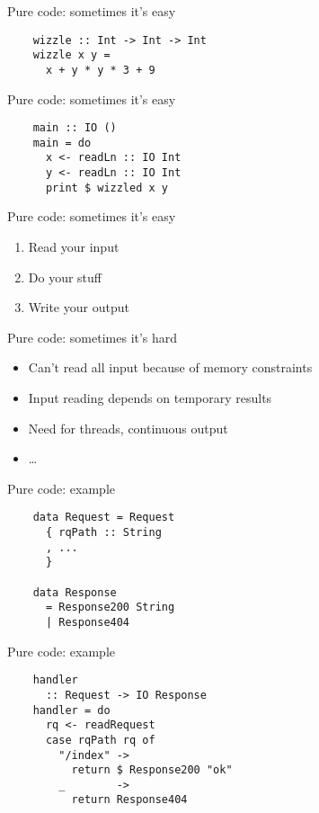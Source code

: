 \documentclass[20pt]{beamer}
\begin{document}
\begin{frame}[fragile]{Pure code: sometimes it's easy}
    \begin{lstlisting}
    wizzle :: Int -> Int -> Int
    wizzle x y =
      x + y * y * 3 + 9
    \end{lstlisting}
\end{frame}

\begin{frame}[fragile]{Pure code: sometimes it's easy}
    \begin{lstlisting}
    main :: IO ()
    main = do
      x <- readLn :: IO Int
      y <- readLn :: IO Int
      print $ wizzled x y
    \end{lstlisting}
\end{frame}

\begin{frame}{Pure code: sometimes it's easy}
    \begin{enumerate}
    \item Read your input
    \item Do your stuff
    \item Write your output
    \end{enumerate}
\end{frame}

\begin{frame}{Pure code: sometimes it's hard}
    \begin{itemize}
    \item Can't read all input because of memory constraints
    \item Input reading depends on temporary results
    \item Need for threads, continuous output
    \item \ldots
    \end{itemize}
\end{frame}

\begin{frame}[fragile]{Pure code: example}
    \begin{lstlisting}
    data Request = Request
      { rqPath :: String
      , ...
      }

    data Response
      = Response200 String
      | Response404
    \end{lstlisting}
\end{frame}

\begin{frame}[fragile]{Pure code: example}
    \begin{lstlisting}
    handler
      :: Request -> IO Response
    handler = do
      rq <- readRequest
      case rqPath rq of
        "/index" ->
          return $ Response200 "ok"
        _        ->
          return Response404
    \end{lstlisting}
\end{frame}
\end{document}
